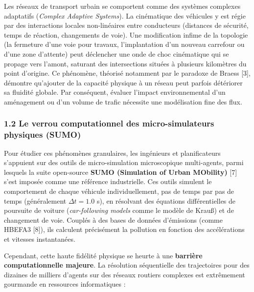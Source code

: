 \documentclass[10pt, a4paper]{article}
\begin{document}
Les réseaux de transport urbain se comportent comme des systèmes
complexes adaptatifs (\emph{Complex Adaptive Systems}). La cinématique
des véhicules y est régie par des interactions locales non-linéaires
entre conducteurs (distances de sécurité, temps de réaction, changements
de voie). Une modification infime de la topologie (la fermeture d'une
voie pour travaux, l'implantation d'un nouveau carrefour ou d'une zone
d'attente) peut déclencher une onde de choc cinématique qui se propage
vers l'amont, saturant des intersections situées à plusieurs kilomètres
du point d'origine. Ce phénomène, théorisé notamment par le paradoxe de
Braess {[}3{]}, démontre qu'ajouter de la capacité physique à un réseau
peut parfois détériorer sa fluidité globale. Par conséquent, évaluer
l'impact environnemental d'un aménagement ou d'un volume de trafic
nécessite une modélisation fine des flux.

\subsubsection{1.2 Le verrou computationnel des micro-simulateurs
physiques
(SUMO)}\label{le-verrou-computationnel-des-micro-simulateurs-physiques-sumo}

Pour étudier ces phénomènes granulaires, les ingénieurs et
planificateurs s'appuient sur des outils de micro-simulation
microscopique multi-agents, parmi lesquels la suite open-source
\textbf{SUMO (Simulation of Urban MObility)} {[}7{]} s'est imposée comme
une référence industrielle. Ces outils simulent le comportement de
chaque véhicule individuellement, pas de temps par pas de temps
(généralement \(\Delta t = 1.0\) s), en résolvant des équations
différentielles de poursuite de voiture (\emph{car-following models}
comme le modèle de Krauß) et de changement de voie. Couplés à des bases
de données d'émissions (comme HBEFA3 {[}8{]}), ils calculent précisément
la pollution en fonction des accélérations et vitesses instantanées.

Cependant, cette haute fidélité physique se heurte à une
\textbf{barrière computationnelle majeure}. La résolution séquentielle
des trajectoires pour des dizaines de milliers d'agents sur des réseaux
routiers complexes est extrêmement gourmande en ressources informatiques
:
\end{document}
